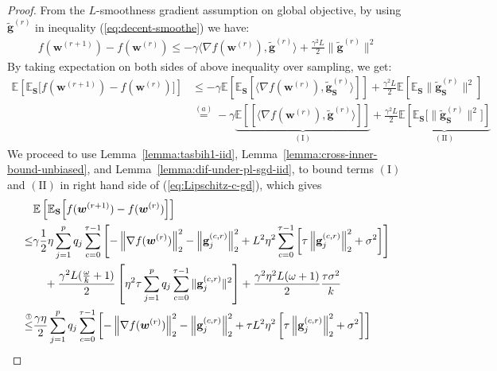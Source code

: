 \documentclass[twoside]{article}
\begin{document}
\begin{proof}
From the $L$-smoothness gradient assumption on global objective, by using  $\tilde{\mathbf{g}}^{(r)}$ in inequality (\ref{eq:decent-smoothe}) we have:
\begin{align}
    f({\boldsymbol{w}}^{(r+1)})-f({\boldsymbol{w}}^{(r)})\leq -\gamma \big\langle\nabla f({\boldsymbol{w}}^{(r)}),\tilde{\mathbf{g}}^{(r)}\big\rangle+\frac{\gamma^2 L}{2}\|\tilde{\mathbf{g}}^{(r)}\|^2\label{eq:Lipschitz-c1}
\end{align}
By taking expectation on both sides of above inequality over sampling, we get:
\begin{align}
    \mathbb{E}\left[\mathbb{E}_\mathbf{S}\Big[f({\boldsymbol{w}}^{(r+1)})-f({\boldsymbol{w}}^{(r)})\Big]\right]&\leq -\gamma\mathbb{E}\left[\mathbb{E}_\mathbf{S}\left[ \big\langle\nabla f({\boldsymbol{w}}^{(r)}),\tilde{\mathbf{g}}_\mathbf{S}^{(r)}\big\rangle\right]\right]+\frac{\gamma^2 L}{2}\mathbb{E}\left[\mathbb{E}_\mathbf{S}\|\tilde{\mathbf{g}}_\mathbf{S}^{(r)}\|^2\right]\nonumber\\
    &\stackrel{(a)}{=}-\gamma\underbrace{\mathbb{E}\left[\left[ \big\langle\nabla f({\boldsymbol{w}}^{(r)}),\tilde{\mathbf{g}}^{(r)}\big\rangle\right]\right]}_{(\mathrm{I})}+\frac{\gamma^2 L}{2}\underbrace{\mathbb{E}\left[\mathbb{E}_\mathbf{S}\Big[\|\tilde{\mathbf{g}}_\mathbf{S}^{(r)}\|^2\Big]\right]}_{\mathrm{(II)}}\label{eq:Lipschitz-c-gd}
\end{align}
We proceed to use Lemma~\ref{lemma:tasbih1-iid}, Lemma~\ref{lemma:cross-inner-bound-unbiased}, and Lemma~\ref{lemma:dif-under-pl-sgd-iid}, to bound  terms $(\mathrm{I})$ and $(\mathrm{II})$ in right hand side of (\ref{eq:Lipschitz-c-gd}), which gives
\begin{align}
     &\mathbb{E}\left[\mathbb{E}_{\mathbf{S}}\Big[f({\boldsymbol{w}}^{(r+1)})-f({\boldsymbol{w}}^{(r)})\Big]\right]\nonumber\\
     \leq& \gamma\frac{1}{2}\eta\sum_{j=1}^pq_j\sum_{c=0}^{\tau-1}\left[-\left\|\nabla f({\boldsymbol{w}}^{(r)})\right\|_2^2-\left\|\mathbf{g}_j^{(c,r)}\right\|_2^2+L^2\eta^2\sum_{c=0}^{\tau-1}\left[\tau\left\|{\mathbf{g}}_j^{(c,r)}\right\|_2^2+\sigma^2\right]\right]\nonumber\\
     &\quad+\frac{\gamma^2 L(\frac{\omega}{k}+1)}{2}\left[{\eta^2\tau}\sum_{j=1}^pq_j\sum_{c=0}^{\tau-1}\|\mathbf{g}^{(c,r)}_{j}\|^2\right]+\frac{\gamma^2\eta^2 L(\omega+1)}{2}\frac{\tau \sigma^2}{k}\nonumber\\
     \stackrel{\text{\ding{192}}}{\leq}&\frac{\gamma\eta}{2}\sum_{j=1}^pq_j\sum_{c=0}^{\tau-1}\left[-\left\|\nabla f({\boldsymbol{w}}^{(r)})\right\|_2^2-\left\|\mathbf{g}_j^{(c,r)}\right\|_2^2+\tau L^2\eta^2\left[\tau\left\|{\mathbf{g}}_j^{(c,r)}\right\|_2^2+\sigma^2\right]\right]\nonumber\\

\end{align}
\end{proof}
\end{document}
